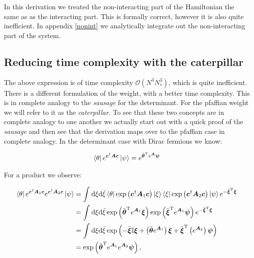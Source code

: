 \documentclass{article}
\begin{document}
In this derivation we treated the non-interacting part of the Hamiltonian the same as as the interacting part. This is formally correct, however it is also quite inefficient. In appendix \ref{nonint} we analytically integrate out the non-interacting part of the system.
\subsection{Reducing time complexity with the caterpillar}
The above expression is of time complexity $\mathcal{O}\left( N^3N_\tau^3 \right)$, which is quite inefficient. There is a different formulation of the weight, with a better time complexity. This is in complete analogy to the \textit{sausage} for the determinant. For the pfaffian weight we will refer to it as the \textit{caterpillar}. To see that these two concepts are in complete analogy to one another we actually start out with a quick proof of the \textit{sausage} and then see that the derivation maps over to the pfaffian case in complete analogy. In the determinant case with Dirac fermions we know:

\begin{align}
		\bra{\theta} e^{\boldsymbol{c}^\dagger \boldsymbol{A}\boldsymbol{c} }\ket{\psi} = e^{\bar{\boldsymbol{\theta}}^\mathrm{T} e^{\boldsymbol{A}}\boldsymbol{\psi}} 
\end{align}

For a product we observe:

\begin{align}
	\bra{\theta} e^{\boldsymbol{c}^{\dagger}\boldsymbol{A}_{1}\boldsymbol{c} } e^{\boldsymbol{c}^{\dagger}\boldsymbol{A}_{2}\boldsymbol{c} }\ket{\psi} &= 
	\int_{ }^{ } \mathrm{d}\xi\mathrm{d} \bar{\xi} \bra{\theta}\exp \left( \boldsymbol{c}^{\dagger} \boldsymbol{A}_{1}\boldsymbol{c}  \right)  \ket{\xi}\bra{\xi}\exp \left( \boldsymbol{c}^{\dagger} \boldsymbol{A}_{2}\boldsymbol{c}  \right)\ket{\psi}e^{-\bar{\boldsymbol{\xi} }^{\mathrm{T}  }\boldsymbol{\xi}} \nonumber \\
	&= \int_{ }^{ } \mathrm{d} \xi \mathrm{d} \bar{\xi} \exp \left( \bar{\boldsymbol{\theta} }^{\mathrm{T}  }e^{\boldsymbol{A}_{1}}\boldsymbol{\xi} \right)
	\exp \left( \bar{\boldsymbol{\xi} }^{\mathrm{T}  }e^{\boldsymbol{A}_{1}}\boldsymbol{\psi} \right)  e^{-\bar{\boldsymbol{\xi} }^{\mathrm{T}  }\boldsymbol{\xi}}\nonumber \\
	&= \int_{ }^{ } \mathrm{d}\xi \mathrm{d} \bar{\xi} \exp \left( -\bar{\boldsymbol{\xi} }\mathbb{I}\boldsymbol{\xi} + \left(\bar{\boldsymbol{\theta} }e^{\boldsymbol{A}_{1} } \right) \boldsymbol{\xi} + \bar{\boldsymbol{\xi} }^{\mathrm{T}} \left(e^{\boldsymbol{A}_{2} } \right)\boldsymbol{\psi}    \right)  \nonumber \\
	&= \exp \left(  \bar{\boldsymbol{\theta} }^{\mathrm{T}}e^{\boldsymbol{A}_{1} }e^{\boldsymbol{A}_{2} } \boldsymbol{\psi}  \right),   
\end{align}
\end{document}
